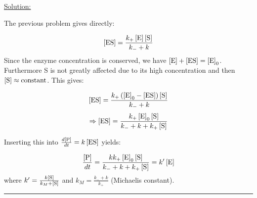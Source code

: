 \noindent
\underline{Solution:}

The previous problem gives directly:

$$\left[\textnormal{ES}\right] = \frac{k_+\left[\textnormal{E}\right]\left[\textnormal{S}\right]}{k_- + k}$$
Since the enzyme concentration is conserved, we have $\left[\textnormal{E}\right] + \left[\textnormal{ES}\right] = \left[\textnormal{E}\right]_0$. Furthermore S is not greatly affected due to its high concentration and then $\left[\textnormal{S}\right] \approx\textnormal{constant}$. This gives:

$$\left[\textnormal{ES}\right] = \frac{k_+\left(\left[\textnormal{E}\right]_0 - \left[\textnormal{ES}\right]\right)\left[\textnormal{S}\right]}{k_-+k}$$
$$\Rightarrow \left[\textnormal{ES}\right] = \frac{k_+\left[\textnormal{E}\right]_0\left[\textnormal{S}\right]}{k_- + k + k_+\left[\textnormal{S}\right]}$$

\noindent
Inserting this into $\frac{d\left[\textnormal{P}\right]}{dt} = k\left[\textnormal{ES}\right]$ yields:

$$\frac{\left[\textnormal{P}\right]}{dt} = \frac{kk_+\left[\textnormal{E}\right]_0\left[\textnormal{S}\right]}{k_-+k+k_+\left[\textnormal{S}\right]} = k'\left[\textnormal{E}\right]$$
where $k' = \frac{k\left[\textnormal{S}\right]}{k_M + \left[\textnormal{S}\right]}$ and $k_M = \frac{k_- + k}{k_+}$ (Michaelis constant).

\hrule\vspace{0.5cm}
